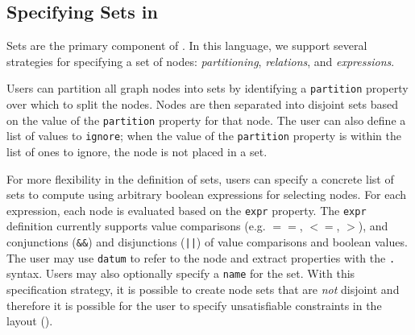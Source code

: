 
\subsection{Specifying Sets in \projectname}
Sets are the primary component of \projectname. In this language, we support several strategies for specifying a set of nodes: \emph{partitioning}, \emph{relations}, and \emph{expressions}.

Users can partition all graph nodes into sets by identifying a \texttt{partition} property over which to split the nodes. Nodes are then separated into disjoint sets based on the value of the \texttt{partition} property for that node. The user can also define a list of values to \texttt{ignore}; when the value of the \texttt{partition} property is within the list of ones to ignore, the node is not placed in a set.


For more flexibility in the definition of sets, users can specify a concrete list of sets to compute using arbitrary boolean expressions for selecting nodes. For each expression, each node is evaluated based on the \texttt{expr} property. The \texttt{expr} definition currently supports value comparisons (e.g. $==$, $<=$, $>$), and conjunctions (\texttt{\&\&}) and disjunctions (\texttt{||}) of value comparisons and boolean values. The user may use \texttt{datum} to refer to the node and extract properties with the \texttt{.} syntax. Users may also optionally specify a \texttt{name} for the set. With this specification strategy, it is possible to create node sets that are \emph{not} disjoint and therefore it is possible for the user to specify unsatisfiable constraints in the layout ().


